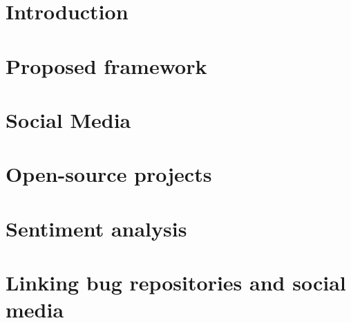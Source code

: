 \documentclass[a4paper,11pt,pdftex,halfparskip,cleardoubleempty]{scrbook}
\begin{document}

\cleardoublepage
\tableofcontents 
\cleardoublepage
{}
\pagestyle{plain} 

\chapter{Introduction}
\label{chp:introduction}
 
 
\chapter{Proposed framework}
\label{chp:proposedFramework}




\chapter{Social Media}
\label{chp:socialMedia}



\chapter{Open-source projects}
\label{chp:ossProjects}



\chapter{Sentiment analysis}
\label{chp:sentimentAnalysis}


\chapter{Linking bug repositories and social media}
\label{chp:pairingBugs}




\label{sec:introduction}


\newpage
\nocite{*}


\end{document}
